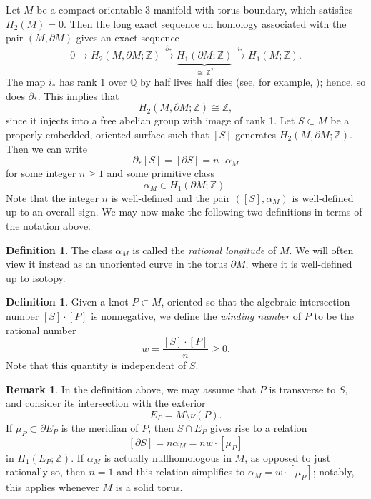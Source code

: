 \documentclass[11pt]{amsart}
\numberwithin{equation}{section}
\numberwithin{theorem}{section}
\theoremstyle{definition}
\newtheorem{definition}[theorem]{Definition}
\newtheorem{remark}[theorem]{Remark}
\newcommand{\Z}{\mathbb{Z}}
\newcommand{\Q}{\mathbb{Q}}
\begin{document}
Let $M$ be a compact orientable 3-manifold with torus boundary, which satisfies $H_2(M) = 0$.  Then the long exact sequence on homology associated with the pair $(M,\partial M)$ gives an exact sequence
\[ 0 \to H_2(M,\partial M; \Z) \xrightarrow{\partial_*} \underbrace{H_1(\partial M; \Z)}_{\cong \,\Z^2} \xrightarrow{i_*} H_1(M; \Z). \]
The map $i_*$ has rank 1 over $\Q$ by half lives half dies (see, for example, \cite[Lemma 3.5]{hatcher-3mfld}); hence, so does $\partial_*$.  This implies that \[H_2(M,\partial M ;\Z) \cong \Z,\] since it injects into a free abelian group with image of rank 1.  
Let $S \subset M$ be a properly embedded, oriented surface such that $[S]$ generates $H_2(M,\partial M;\Z)$. Then we can write
\[ \partial_*[S] = [\partial S] = n \cdot \alpha_M \]
for some integer $n \geq 1$ and some primitive class \[\alpha_M \in H_1(\partial M; \Z).\]  Note that the integer $n$ is well-defined and the pair $([S],\alpha_M)$ is well-defined up to an overall sign. We may now make the following two definitions in terms of the notation above.

\begin{definition}\label{def:rational-longitude}
The class $\alpha_M$ is called the \emph{rational longitude} of $M$. We will often view it instead as an  unoriented curve in the torus $\partial M$, where it is well-defined up to isotopy.
\end{definition}

\begin{definition}\label{def:winding-number}
Given a knot $P\subset M$, oriented so that the algebraic intersection number $[S] \cdot [P]$ is nonnegative, we define the \emph{winding number} of $P$ to be the rational number \[ w = \frac{[S] \cdot [P]}{n} \geq 0. \] Note that this quantity is independent of $S$.
\end{definition}

\begin{remark}\label{rmk:relation-S}
In the definition above, we may assume that $P$ is transverse to $S$, and consider its intersection with the exterior \[E_P = M \setminus \nu(P).\]  If $\mu_P \subset \partial E_P$ is the meridian of $P$, then $S \cap E_P$ gives rise to a relation
\begin{equation} \label{eq:rational-longitude-vs-muP}
[\partial S]=n \alpha_M = nw \cdot [\mu_P]
\end{equation}
in $H_1(E_P;\Z)$. If $\alpha_M$ is actually nullhomologous in $M$, as opposed to just rationally so, then $n=1$ and this relation simplifies to $\alpha_M = w\cdot [\mu_P]$; notably, this applies whenever $M$ is a solid torus.
\end{remark}
\end{document}
